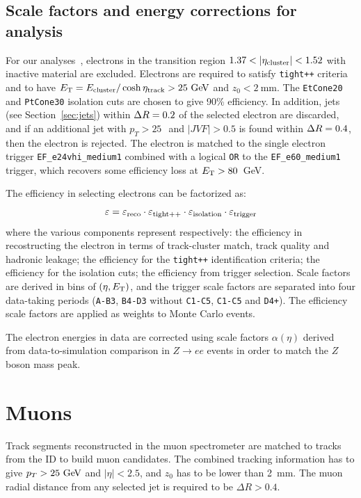 \subsection{Scale factors and energy corrections for analysis}

For our analyses~\cite{Acharya:1509562}, electrons in the transition region $1.37<|\eta_{\rm cluster}| <1.52$
with inactive material are excluded. Electrons are required to satisfy \texttt{tight++} criteria and to
 have $\et = E_{\rm cluster}/\cosh\eta_{\rm track} > 25\gev$ and $z_0<2~$mm.
The \texttt{EtCone20} and \texttt{PtCone30} isolation cuts are chosen to give
90\% efficiency.
In addition, jets (see Section~\ref{sec:jets}) within $\dr =0.2$ of the selected electron are 
discarded, and if an additional jet with $p_T>25~$\gev\  and $|JVF|>0.5$ is found within $\dr =0.4$,
then the electron is rejected.
The electron is matched to the single electron trigger \texttt{EF\_e24vhi\_medium1}
combined with a logical \texttt{OR} to the \texttt{EF\_e60\_medium1} trigger, which
recovers some efficiency loss at $\ET > 80$~GeV.

The efficiency in selecting electrons can be factorized as:
\begin{equation}\label{eq:eleeff}
\varepsilon = \varepsilon_{\rm reco} \cdot\varepsilon_{\rm tight++} \cdot\varepsilon_{\rm isolation} \cdot\varepsilon_{\rm trigger} 
	\end{equation}
where the various components represent respectively: the efficiency in recostructing the electron 
in terms of track-cluster match, track quality and hadronic leakage; the efficiency
for the \texttt{tight++} identification criteria; the efficiency for the isolation cuts;
the efficiency from trigger selection. Scale factors are derived in bins of $(\eta, \ET)$,
and the trigger scale factors are separated into four data-taking periods 
(\texttt{A-B3}, \texttt{B4-D3} without \texttt{C1-C5}, \texttt{C1-C5} and \texttt{D4+}).
The efficiency scale factors are applied as weights to Monte Carlo events.

The electron energies in data are corrected using scale factors $\alpha(\eta)$ derived
from data-to-simulation comparison in $Z\to ee$ events in order to match the $Z$ boson 
mass peak.

\section{Muons}\label{sec:muons}
Track segments reconstructed in the muon spectrometer are matched to tracks from the ID to build
muon candidates. The combined tracking information has to give $p_T>25\gev$ and $|\eta|<2.5$, and
$z_{0}$ has to be lower than 2~mm.
The muon radial distance from any selected jet is required to be $\Delta R > 0.4$.

